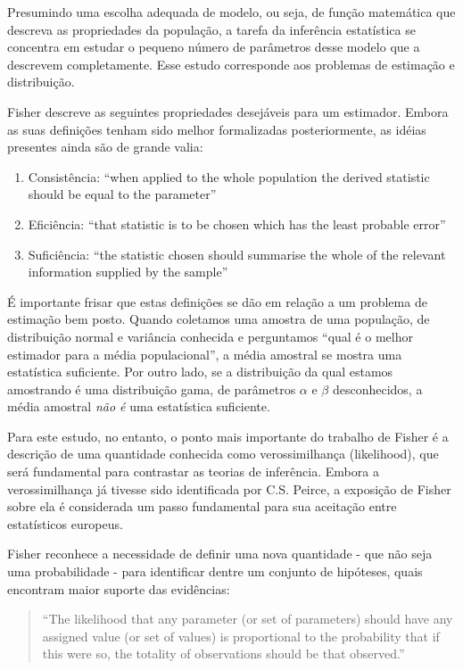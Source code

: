 Presumindo uma escolha adequada de modelo, ou seja,	de função matemática que descreva as propriedades da população,
a tarefa da inferência estatística se concentra em estudar o pequeno número de parâmetros desse modelo que a descrevem
completamente. Esse estudo corresponde aos problemas de estimação e distribuição.

Fisher descreve as seguintes propriedades desejáveis para um estimador. Embora as suas definições tenham sido
melhor formalizadas posteriormente, as idéias presentes ainda são de grande valia:
\begin{enumerate}
	\item Consistência: ``when applied to the whole population the derived statistic should be equal to the parameter''
	\item Eficiência: ``that statistic is to be chosen which has the least probable error''
	\item Suficiência: ``the statistic chosen should summarise the whole of the relevant information supplied by the sample''
\end{enumerate}

É importante frisar que estas definições se dão em relação a um problema de estimação bem posto. Quando coletamos
uma amostra de uma população, de distribuição normal e variância conhecida e perguntamos ``qual é o melhor estimador para a média populacional'', 
a média amostral se mostra uma estatística suficiente. Por outro lado, se a distribuição da qual estamos amostrando
é uma distribuição gama, de parâmetros $\alpha$ e $\beta$ desconhecidos, a média amostral {\em não é} uma estatística
suficiente.

Para este estudo, no entanto, o ponto mais importante do trabalho de Fisher é a descrição de uma 
quantidade conhecida como
verossimilhança (likelihood), que será fundamental para contrastar as teorias de inferência. Embora 
a verossimilhança já tivesse sido identificada por C.S.
Peirce, a exposição de Fisher sobre ela é considerada um passo fundamental para sua aceitação entre 
estatísticos europeus. 

Fisher reconhece a necessidade de definir uma nova quantidade - que não seja uma probabilidade - para
identificar dentre um conjunto de hipóteses, quais encontram maior suporte das evidências:

\begin{quote}
``The likelihood that any parameter (or set of parameters) should have
any assigned value (or set of values) is proportional to the probability
that if this were so, the totality of observations should be that observed.''\citep{Fisher1922}
\end{quote}


